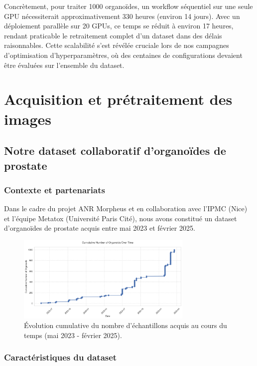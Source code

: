 Concrètement, pour traiter 1000 organoïdes, un workflow séquentiel sur une seule GPU nécessiterait approximativement 330 heures (environ 14 jours). Avec un déploiement parallèle sur 20 GPUs, ce temps se réduit à environ 17 heures, rendant praticable le retraitement complet d'un dataset dans des délais raisonnables. Cette scalabilité s'est révélée cruciale lors de nos campagnes d'optimisation d'hyperparamètres, où des centaines de configurations devaient être évaluées sur l'ensemble du dataset.

\section{Acquisition et prétraitement des images}

\subsection{Notre dataset collaboratif d'organoïdes de prostate}

\subsubsection{Contexte et partenariats}

Dans le cadre du projet ANR Morpheus et en collaboration avec l'IPMC (Nice) et l'équipe Metatox (Université Paris Cité), nous avons constitué un dataset d'organoïdes de prostate acquis entre mai 2023 et février 2025.

\begin{figure}[htbp]
    \centering
    \includegraphics[width=0.75\textwidth]{../img/cumulative_organoids.png}
    \caption{Évolution cumulative du nombre d'échantillons acquis au cours du temps (mai 2023 - février 2025).}
    \label{fig:cumulative_organoids}
\end{figure}

\subsubsection{Caractéristiques du dataset}

